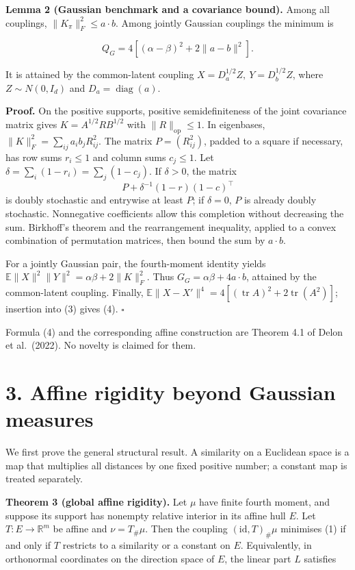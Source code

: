 \documentclass[
  british,
  11pt,
  a4paper,
]{article}
\newcounter{none} %
\begin{document}
\textbf{Lemma 2 (Gaussian benchmark and a covariance bound).} Among all
couplings, \(\|K_\pi\|_F^2\leq a\cdot b\). Among jointly Gaussian
couplings the minimum is

\[
Q_G=4\left[(\alpha-\beta)^2+2\|a-b\|^2\right].                 \tag{4}
\]

It is attained by the common-latent coupling
\(X=D_a^{1/2}Z,\ Y=D_b^{1/2}Z\), where \(Z\sim N(0,I_d)\) and
\(D_a=\operatorname{diag}(a)\).

\textbf{Proof.} On the positive supports, positive semidefiniteness of
the joint covariance matrix gives \(K=A^{1/2}RB^{1/2}\) with
\(\|R\|_{\mathrm{op}}\leq1\). In eigenbases,
\(\|K\|_F^2=\sum_{ij}a_i b_j R_{ij}^2\). The matrix \(P=(R_{ij}^2)\),
padded to a square if necessary, has row sums \(r_i\le1\) and column
sums \(c_j\le1\). Let \(\delta=\sum_i(1-r_i)=\sum_j(1-c_j)\). If
\(\delta>0\), the matrix \[
P+\delta^{-1}(1-r)(1-c)^\top
\] is doubly stochastic and entrywise at least \(P\); if \(\delta=0\),
\(P\) is already doubly stochastic. Nonnegative coefficients allow this
completion without decreasing the sum. Birkhoff's theorem and the
rearrangement inequality, applied to a convex combination of permutation
matrices, then bound the sum by \(a\cdot b\).

For a jointly Gaussian pair, the fourth-moment identity yields
\(\mathbb E\|X\|^2\|Y\|^2=\alpha\beta+2\|K\|_F^2\). Thus
\(G_G=\alpha\beta+4a\cdot b\), attained by the common-latent coupling.
Finally,
\(\mathbb E\|X-X'\|^4=4[(\operatorname{tr}A)^2+2\operatorname{tr}(A^2)]\);
insertion into (3) gives (4). \(\square\)

Formula (4) and the corresponding affine construction are Theorem 4.1 of
Delon et al.~(2022). No novelty is claimed for them.

\section{3. Affine rigidity beyond Gaussian
measures}\label{affine-rigidity-beyond-gaussian-measures}

We first prove the general structural result. A similarity on a
Euclidean space is a map that multiplies all distances by one fixed
positive number; a constant map is treated separately.

\textbf{Theorem 3 (global affine rigidity).} Let \(\mu\) have finite
fourth moment, and suppose its support has nonempty relative interior in
its affine hull \(E\). Let \(T:E\to\mathbb R^m\) be affine and
\(\nu=T_\#\mu\). Then the coupling \((\mathrm{id},T)_\#\mu\) minimises
(1) if and only if \(T\) restricts to a similarity or a constant on
\(E\). Equivalently, in orthonormal coordinates on the direction space
of \(E\), the linear part \(L\) satisfies
\end{document}
